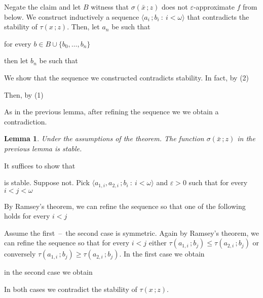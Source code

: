 \documentclass{amsproc}
\makeatletter
\newcounter{thm}
\theoremstyle{mio}
\newtheorem{lemma}[thm]{Lemma}\tcolorboxenvironment{lemma}{mythm}
\providecommand{\proofNameStyle}{\bfseries}
\renewenvironment{proof}[1][\proofname]{\par
  \pushQED{\qed}%
  \normalfont%
  \trivlist
  \item[\hskip\labelsep
        \proofNameStyle
    #1\@addpunct{.}]\ignorespaces
}{%
  \popQED\endtrivlist\@endpefalse
}
\makeatother
\begin{document}
\begin{proof}
  Negate the claim and let $B$ witness that $\sigma(\bar x\,;z)$ does not $\varepsilon$-approximate $f$ from below.
  We construct inductively a sequence $\langle a_i\,;b_i\ :\ i<\omega\rangle$ that contradicts the stability of $\tau(x\,;z)$.
  Then, let $a_n$ be such that

  \hfill for every $b\in B\cup\{b_0,\dots,b_n\}$

  then let $b_n$ be such that


  We show that the sequence we constructed contradicts stability.
  In fact, by (2)


  Then, by (1)


  As in the previous lemma, after refining the sequence we we obtain a contradiction.
\end{proof}

\begin{lemma}
  Under the assumptions of the theorem.
  The function $\sigma(\bar x\,;z)$ in the previous lemma is stable. 
\end{lemma}

\begin{proof}
  It suffices to show that


  is stable.
  Suppose not.
  Pick $\langle a_{1,i},a_{2,i}\,;b_i\ :\ i<\omega\rangle$ and $\varepsilon>0$  such that for every $i<j<\omega$


  By Ramsey's theorem, we can refine the sequence so that one of the following holds for every $i<j$

  

Assume the first~--~the second case is symmetric.
Again by Ramsey's theorem, we can refine the sequence so that for every $i<j$ either  $\tau(a_{1,i}\,;b_j)\le\tau(a_{2,i}\,;b_j)$ or conversely $\tau(a_{1,i}\,;b_j)\ge\tau(a_{2,i}\,;b_j)$.
In the first case we obtain


in the second case we obtain


In both cases we contradict the stability of $\tau(x\,;z)$.
\end{proof}
\end{document}
